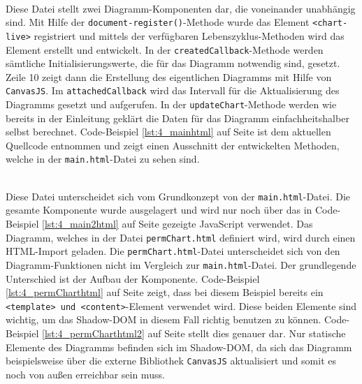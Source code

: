 \begin{enumerate}
 \hfill \\
Diese Datei stellt zwei Diagramm-Komponenten dar, die voneinander unabhängig sind. Mit Hilfe der \lstinline|document-register()|-Methode wurde das Element \lstinline|<chart-live>| registriert und mittels der verfügbaren Lebenszyklus-Methoden wird das Element erstellt und entwickelt. In der \lstinline|createdCallback|-Methode werden sämtliche Initialisierungswerte, die für das Diagramm notwendig sind, gesetzt. Zeile 10 zeigt dann die Erstellung des eigentlichen Diagramms mit Hilfe von \lstinline|CanvasJS|. Im \lstinline|attachedCallback| wird das Intervall für die Aktualisierung des Diagramms gesetzt und aufgerufen. In der \lstinline|updateChart|-Methode werden wie bereits in der Einleitung geklärt die Daten für das Diagramm einfachheitshalber selbst berechnet. Code-Beispiel \ref{lst:4_mainhtml} auf Seite \pageref{lst:4_mainhtml} ist dem aktuellen Quellcode entnommen und zeigt einen Ausschnitt der entwickelten Methoden, welche in der \lstinline|main.html|-Datei zu sehen sind.



 \hfill \\
Diese Datei unterscheidet sich vom Grundkonzept von der \lstinline|main.html|-Datei. Die gesamte Komponente wurde ausgelagert und wird nur noch über das in Code-Beispiel \ref{lst:4_main2html} auf Seite \pageref{lst:4_main2html} gezeigte JavaScript verwendet. Das Diagramm, welches in der Datei \lstinline|permChart.html| definiert wird, wird durch einen HTML-Import geladen. Die \lstinline|permChart.html|-Datei unterscheidet sich von den Diagramm-Funktionen nicht im Vergleich zur \lstinline|main.html|-Datei. Der grundlegende Unterschied ist der Aufbau der Komponente. Code-Beispiel \ref{lst:4_permCharthtml} auf Seite \pageref{lst:4_permCharthtml} zeigt, dass bei diesem Beispiel bereits ein \lstinline|<template> und <content>|-Element verwendet wird. Diese beiden Elemente sind wichtig, um das Shadow-DOM in diesem Fall richtig benutzen zu können. Code-Beispiel \ref{lst:4_permCharthtml2} auf Seite \pageref{lst:4_permCharthtml2} stellt dies genauer dar. Nur statische Elemente des Diagramms befinden sich im Shadow-DOM, da sich das Diagramm beispielsweise über die externe Bibliothek \lstinline|CanvasJS| aktualisiert und somit es noch von außen erreichbar sein muss.


\end{enumerate}
